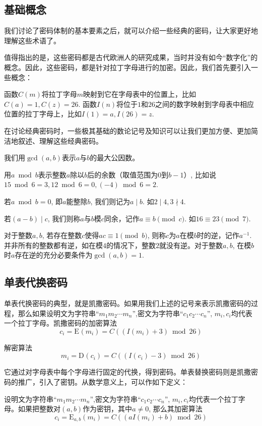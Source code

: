 \documentclass[UTF8]{ctexrep}
\def\pth#1{\left( {#1}\right)}
\def\E#1#2{{\mathrm{E}_{#1}\left({#2}\right)}}
\def\D#1#2{{\mathrm{D}_{#1}\left({#2}\right)}}
\begin{document}
\subsection{基础概念}
我们讨论了密码体制的基本要素之后，就可以介绍一些经典的密码，让大家更好地理解这些术语了。\par
值得指出的是，这些密码都是古代欧洲人的研究成果，当时并没有如今“数字化”的概念。因此，这些密码，都是针对拉丁字母进行的加密。因此，我们首先要引入一些概念：\par
函数$C\pth{m}$将拉丁字母$m$映射到它在字母表中的位置上，比如$C(a)=1, C(z)=26$. 函数$I\pth{n}$将位于$1$和$26$之间的数字映射到字母表中相应位置的拉丁字母上，比如$I(1)=a, I(26)=z$.\par
在讨论经典密码时，一些极其基础的数论记号及知识可以让我们更加方便、更加简洁地叙述、理解这些经典密码。\par
我们用$\gcd\pth{a, b}$表示$a$与$b$的最大公因数。\par
用$a\bmod{b}$表示整数$a$除以$b$后的余数（取值范围为$0$到$b-1$）, 比如说$15\bmod{6}=3, 12\bmod{6}=0, \pth{-4}\bmod{6}=2$.\par
若$a\bmod{b}=0$, 即$a$能整除$b$, 我们则记为$a\mid b$. 如$2\mid 4, 3\nmid 4$.\par
若$\pth{a-b}\mid c$, 我们则称$a$与$b$模$c$同余，记作$a\equiv b\pmod{c}$. 如$16\equiv 23\pmod{7}$.\par
对于整数$a, b$, 若存在整数$c$使得$ac\equiv 1\pmod{b}$, 则称$c$为$a$在模$b$时的逆，记作$a^{-1}$. 并非所有的整数都有逆，如在模$4$的情况下，整数$2$就没有逆。对于整数$a, b$, 在模$b$时$a$存在逆的充分必要条件为$\gcd\pth{a, b}=1$.
\subsection{单表代换密码}
单表代换密码的典型，就是凯撒密码。如果用我们上述的记号来表示凯撒密码的过程，那么如果设明文为字符串``$m_1m_2\cdots m_n$'',密文为字符串``$c_1c_2\cdots c_n$'', $m_i, c_i$均代表一个拉丁字母。凯撒密码的加密算法
\begin{equation}
    c_i=\E{}{m_i}=C\pth{\pth{I\pth{m_i}+3}\bmod{26}}
\end{equation}

解密算法
\begin{equation}
    m_i=\D{}{c_i}=C\pth{\pth{I\pth{c_i}-3}\bmod{26}}
\end{equation}

它通过对字母表中每个字母进行固定的代换，得到密码。单表替换密码则是凯撒密码的推广，引入了密钥。从数学意义上，可以作如下定义：\par
设明文为字符串``$m_1m_2\cdots m_n$'',密文为字符串``$c_1c_2\cdots c_n$'', $m_i, c_i$均代表一个拉丁字母。如果把整数对$\pth{a, b}$作为密钥，其中$a\neq 0$, 那么其加密算法
\[c_i=\E{a, b}{m_i}=C\pth{\pth{aI\pth{m_i}+b}\bmod{26}}\]
\end{document}
